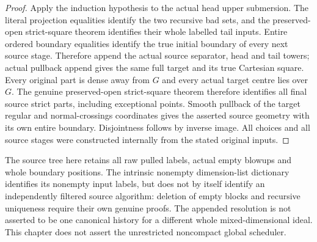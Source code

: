 \begin{proof}
Apply the induction hypothesis to the actual head upper submersion.
The literal projection equalities identify the two recursive bad
sets, and the preserved-open strict-square theorem identifies their
whole labelled tail inputs. Entire ordered boundary equalities
identify the true initial boundary of every next source stage.
Therefore append the actual source separator, head and tail towers;
actual pullback append gives the same full target and its true
Cartesian square. Every original part is dense away from $G$ and
every actual target centre lies over $G$. The genuine preserved-open
strict-square theorem therefore identifies all final source strict
parts, including exceptional points. Smooth pullback of the target
regular and normal-crossings coordinates gives the asserted source
geometry with its own entire boundary. Disjointness follows by
inverse image. All choices and all source stages were constructed
internally from the stated original inputs.
\end{proof}

\begin{remark}
The source tree here retains all raw pulled labels, actual empty
blowups and whole boundary positions. The intrinsic nonempty
dimension-list dictionary identifies its nonempty input labels, but
does not by itself identify an independently filtered source
algorithm: deletion of empty blocks and recursive uniqueness require
their own genuine proofs. The appended resolution is not asserted to
be one canonical history for a different whole mixed-dimensional
ideal. This chapter does not assert the unrestricted noncompact
global scheduler.
\end{remark}
